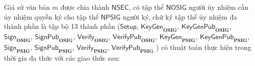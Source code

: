 \begin{defi} Giả sử văn bản $m$ được chia thành $ \mathsf{NSEC}$, có tập thể $ \mathsf{NOSIG}$ người ủy nhiệm cần ủy nhiệm quyền ký cho tập thể $ \mathsf{NPSIG}$ người ký, chữ ký tập thể ủy nhiệm đa thành phần là tập bộ 13 thành phần ($\boldsymbol{\mathsf{Setup}}$, $\boldsymbol{\mathsf{KeyGen}_{OSIG}}$, $\boldsymbol{\mathsf{KeyGenPub}_{OSIG}}$, $\boldsymbol{\mathsf{Sign}_{OSIG}}$, $\boldsymbol{\mathsf{SignPub}_{OSIG}}$, $\boldsymbol{\mathsf{Verify}_{OSIG}}$, $\boldsymbol{\mathsf{VerifyPub}_{OSIG}}$,  $\boldsymbol{\mathsf{KeyGen}_{PSIG}}$, $\boldsymbol{\mathsf{KeyGenPub}_{PSIG}}$, $\boldsymbol{\mathsf{Sign}_{PSIG}}$, $\boldsymbol{\mathsf{SignPub}_{PSIG}}$, $\boldsymbol{\mathsf{Verify}_{PSIG}}$, $\boldsymbol{\mathsf{VerifyPub}_{PSIG}}$ )  có thuật toán thực hiện trong thời gia đa thức với các giao thức sau:  \label{dn311}


\end{defi}
